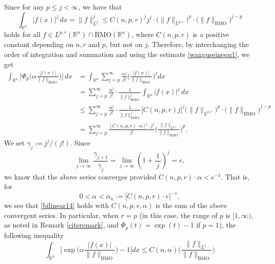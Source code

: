\documentclass{birkjour}
\theoremstyle{definition}
\theoremstyle{remark}
\numberwithin{equation}{section}
\begin{document}
Since for any $p\leq j<\infty$, we have that
\begin{equation}\label{wanguseinequ1}
\int_{\mathbb R^n}|f(x)|^j\,dx=\big\|f\big\|^j_{L^{j}}\leq {C}(n,p,r)^jj^j\cdot\big(\|f\|_{L^{p,r}}\big)^p\cdot\big(\|f\|_{\mathrm{BMO}}\big)^{j-p}
\end{equation}
holds for all $f\in L^{p,r}(\mathbb R^n)\cap\mathrm{BMO}(\mathbb R^n)$, where ${C}(n,p,r)$ is a positive constant depending on $n,r$ and $p$, but not on $j$. Therefore, by interchanging the order of integration and summation and using the estimate \eqref{wanguseinequ1}, we get
\begin{equation*}
\begin{split}
\int_{\mathbb R^n}\bigg[\Phi_p\Big(\alpha\frac{|f(x)|}{\|f\|_{\mathrm{BMO}}}\Big)\bigg]\,dx
&=\int_{\mathbb R^n}\sum_{j=p}^{\infty}\frac{\alpha^j}{j!}\bigg(\frac{|f(x)|}{\|f\|_{\mathrm{BMO}}}\bigg)^jdx\\
&=\sum_{j=p}^{\infty}\frac{\alpha^j}{j!}\cdot\frac{1}{\|f\|^j_{\mathrm{BMO}}}\int_{\mathbb R^n}|f(x)|^j\,dx\\
&\leq \sum_{j=p}^{\infty}\frac{\alpha^j}{j!}\cdot\frac{1}{\|f\|^j_{\mathrm{BMO}}}\big[{C}(n,p,r)j\big]^{j}
\big(\|f\|_{L^{p,r}}\big)^p\cdot\big(\|f\|_{\mathrm{BMO}}\big)^{j-p}\\
&=\sum_{j=p}^{\infty}\frac{[{C}(n,p,r)\cdot\alpha]^j\cdot j^{j}}{j!}
\bigg(\frac{\|f\|_{L^{p,r}}}{\|f\|_{\mathrm{BMO}}}\bigg)^p.
\end{split}
\end{equation*}
We set $\gamma_j:=j^j/{(j!)}$. Since
\begin{equation*}
\lim_{j\to\infty}\frac{\gamma_{j+1}}{\gamma_j}=\lim_{j\to\infty}\left(1+\frac{\,1\,}{j}\right)^{j}=e,
\end{equation*}
we know that the above series converges provided ${C}(n,p,r)\cdot\alpha<e^{-1}$. That is, for
\begin{equation*}
0<\alpha<\alpha_n:=\big[{C}(n,p,r)\cdot e\big]^{-1},
\end{equation*}
we see that \eqref{bilinear14} holds with $C({n,p,r,\alpha})$ is the sum of the above convergent series.
In particular, when $r=p$ (in this case, the range of $p$ is $[1,\infty)$, as noted in Remark \ref{citeremark}, and $\Phi_p(t)=\exp(t)-1$ if $p=1$), the following inequality
\begin{equation}\label{japenm}
\int_{\mathbb R^n}\bigg[\exp\Big(\alpha\frac{|f(x)|}{\|f\|_{\mathrm{BMO}}}\Big)-1\bigg]dx
\leq C({n,\alpha})\bigg(\frac{\|f\|_{L^1}}{\|f\|_{\mathrm{BMO}}}\bigg)
\end{equation}
\end{document}
